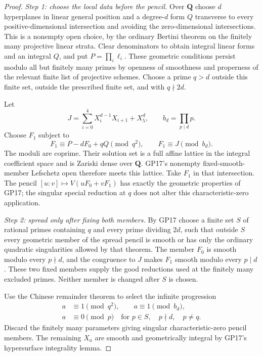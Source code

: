 \begin{proof}
\emph{Step 1: choose the local data before the pencil.}
Over $\mathbf Q$ choose $d$ hyperplanes in linear general position
and a degree-$d$ form $Q$ transverse to every positive-dimensional
intersection and avoiding the zero-dimensional intersections.
This is a nonempty open choice, by the ordinary Bertini theorem on
the finitely many projective linear strata.  Clear denominators to
obtain integral linear forms and an integral $Q$, and put
$P=\prod_i\ell_i$.  These geometric conditions persist modulo
all but finitely many primes by openness of smoothness and
properness of the relevant finite list of projective schemes.
Choose a prime $q>d$ outside this finite set, outside the prescribed
finite set, and with $q\nmid2d$.

Let
\[
 J=\sum_{i=0}^4X_i^{d-1}X_{i+1}+X_5^d,
 \qquad b_d=\prod_{p\mid d}p.
\]
Choose $F_1$ subject to
\[
       F_1\equiv P-dF_0+qQ\pmod{q^2},
       \qquad F_1\equiv J\pmod{b_d}.
 \tag{GF18.3}\label{r18gf:form-congruences}
\]
The moduli are coprime.  Their solution set is a full affine lattice
in the integral coefficient space and is Zariski dense over
$\mathbf Q$.  GP17's nonempty fixed-smooth-member Lefschetz open
therefore meets this lattice.  Take $F_1$ in that intersection.
The pencil $[u:v]\mapsto V(uF_0+vF_1)$ has exactly the geometric
properties of GP17; the singular special reduction at $q$ does
not alter this characteristic-zero application.

\emph{Step 2: spread only after fixing both members.}
By GP17 choose a finite set $S$ of rational primes containing
$q$ and every prime dividing $2d$, such that outside $S$ every
geometric member of the spread pencil is smooth or has only the
ordinary quadratic singularities allowed by that theorem.
The member $F_0$ is smooth modulo every $p\nmid d$, and the
congruence to $J$ makes $F_1$ smooth modulo every $p\mid d$.
These two fixed members supply the good reductions used at the
finitely many excluded primes.  Neither member is changed after
$S$ is chosen.

Use the Chinese remainder theorem to select the infinite progression
\[
 \begin{split}
 a&\equiv1\pmod{q^2},\qquad a\equiv1\pmod{b_d},\\
 a&\equiv0\pmod p
       \quad\text{for }p\in S,\quad p\nmid d,\quad p\ne q.
 \end{split}
 \tag{GF18.4}\label{r18gf:parameter-congruences}
\]
Discard the finitely many parameters giving singular
characteristic-zero pencil members.  The remaining $X_a$ are smooth
and geometrically integral by GP17's hypersurface integrality lemma.


\end{proof}
